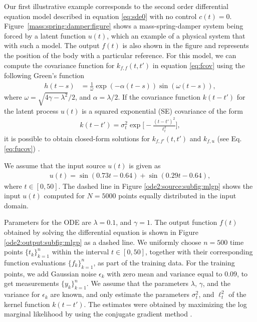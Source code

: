 \documentclass[journal]{IEEEtran}
\begin{document}
Our first illustrative example corresponds to the second order differential equation model described in equation \eqref{eq:sde0} with no control $c(t) = 0$. Figure~\ref{mass:spring:damper:figure} shows a mass-spring-damper system being forced by a latent function $u(t)$, which an example of a physical system that with such a model. The output $f(t)$ is also shown in the figure and represents the position of the body with a particular reference. For this model, we can compute the covariance function for $k_{f,f}(t,t')$ in equation \eqref{eq:fcov} using the following Green's function 
\begin{align}\label{Greens:ODE:2}
h(t-s) & = \frac{1}{\omega}\exp(-\alpha(t-s))\sin(\omega(t-s)),
\end{align} 
where $\omega = \sqrt{4\gamma - \lambda^2}/2$, and $\alpha =
\lambda/2$. 
If the covariance function $k(t-t')$ for the latent process $u(t)$  is a squared exponential (SE) covariance of the form 
\begin{align*}
k(t -t') = \sigma_t^2\exp\Bigg[-\frac{(t-t')^2}{\ell^2_t}\Bigg],
\end{align*}
it is possible to obtain closed-form solutions for $k_{f,f'}(t,t')$ and $k_{f,u}$ (see Eq. \eqref{eq:fucov}) \cite{Alvarez+Luengo+Lawrence:2009}.
 
We assume that the input source $u(t)$ is given as
\begin{align*}
u(t) = \sin(0.73t - 0.64) + \sin(0.29t- 0.64),
\end{align*}
where $t\in [0,50]$. The dashed line in Figure \ref{ode2:source:subfig:mlgp}  shows the input $u(t)$ computed for
$N=5000$ points equally distributed in the input domain. 

Parameters for the ODE are $\lambda = 0.1$, and $\gamma = 1$. The output function $f(t)$ obtained by solving the
differential equation is shown in Figure \ref{ode2:output:subfig:mlgp} as a dashed line. 
We uniformly choose $n=500$ time points $\{t_k\}_{k=1}^n$ within the interval $t\in [0,50]$, together with their
corresponding function evaluations $\{f_k\}_{k=1}^n$, as part of the training data. For the training points, we add Gaussian noise
$\epsilon_k$ with zero mean and variance equal to $0.09$, to get
measurements $\{y_k\}_{k=1}^n$. We assume that the parameters
$\lambda$, $\gamma$, and the variance for $\epsilon_k$ are known, and
only estimate the parameters $\sigma_t^2$,
and $\ell^2_t$ of the kernel function $k(t-t')$. The estimates were obtained by maximizing the log marginal likelihood by using the conjugate gradient method \cite{Rasmussen+Williams:2006}.
\end{document}
